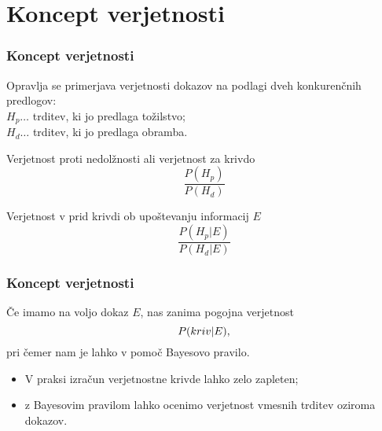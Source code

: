 \documentclass{beamer}
\begin{document}
\section{Koncept verjetnosti}

\begin{frame}
    \frametitle{Koncept verjetnosti}
    Opravlja se primerjava verjetnosti dokazov na podlagi dveh konkurenčnih predlogov:\\
    $H_p \dots$ trditev, ki jo predlaga tožilstvo;\\
    $H_d \dots$ trditev, ki jo predlaga obramba.\\ \vspace{5mm}
   \begin{beamerboxesrounded}[]{Verjetnost proti nedolžnosti ali verjetnost za krivdo}
      \[
          \frac{P(H_p)}{P(H_d)}
      \]    
  \end{beamerboxesrounded} \vspace{3mm}
  \begin{beamerboxesrounded}[]{Verjetnost v prid krivdi ob upoštevanju informacij $E$}
      \[
          \frac{P(H_p \lvert E)}{P(H_d \lvert E)} 
      \]    
  \end{beamerboxesrounded} \vspace{5mm}
\end{frame}

\begin{frame}
   \frametitle{Koncept verjetnosti}
   Če imamo na voljo dokaz $E$, nas zanima pogojna verjetnost
   \[
       P(kriv \lvert E), \vspace{2mm}
   \]
   pri čemer nam je lahko v pomoč Bayesovo pravilo. \vspace{3mm}
   \begin{itemize}
      \item V praksi izračun verjetnostne krivde lahko zelo zapleten;
      \item z Bayesovim pravilom lahko ocenimo verjetnost vmesnih trditev oziroma dokazov.
   \end{itemize}
\end{frame}

\end{document}
